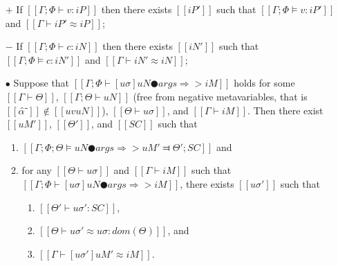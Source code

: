 \begin{lemma}
    \label{lemma:typing-completeness}
    \hfill
    \begin{itemize}
        \item [$+$] If $[[Γ; Φ ⊢ v : iP]]$ then 
            there exists $[[iP']]$ such that $[[Γ; Φ ⊨ v : iP']]$ and 
            $[[Γ ⊢ iP' ≈ iP]]$;
        \item [$-$] If $[[Γ; Φ ⊢ c : iN]]$ then 
            there exists $[[iN']]$ such that $[[Γ; Φ ⊨ c : iN']]$
            and $[[Γ ⊢ iN' ≈ iN]]$;
        \item [$\bullet$] Suppose that 
            $[[Γ; Φ ⊢ [uσ]uN ● args ⇒> iM]]$ holds for some
            $[[Γ ⊢ Θ]]$,
            $[[Γ; Θ ⊢ uN]]$ (free from negative metavariables, that is $[[α̂⁻]] \notin [[uv uN]]$), 
            $[[Θ ⊢ uσ]]$, and $[[Γ ⊢ iM]]$. Then
            there exist $[[uM']]$, $[[Θ']]$, and $[[SC]]$ such that
            \begin{enumerate}
                \item $[[ Γ; Φ; Θ ⊨ uN ● args ⇒> uM' ⫤ Θ'; SC ]]$ and
                \item for any $[[Θ ⊢ uσ]]$ and $[[Γ ⊢ iM]]$
                    such that $[[Γ; Φ ⊢ [uσ]uN ● args ⇒> iM]]$, 
                    there exists $[[uσ']]$ such that 
                    \begin{enumerate}
                        \item $[[Θ' ⊢ uσ' : SC]]$,
                        \item $[[Θ ⊢ uσ' ≈ uσ : dom(Θ)]]$, and 
                        \item $[[Γ ⊢ [uσ']uM' ≈ iM]]$.
                    \end{enumerate}
            \end{enumerate}
    \end{itemize}
\end{lemma}
